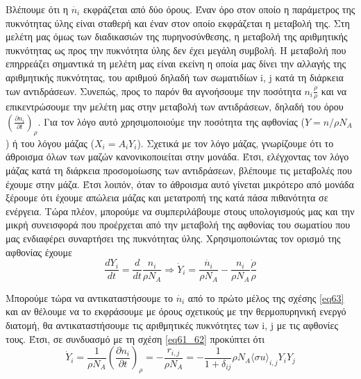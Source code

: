 Βλέπουμε ότι η $\dot{n_{i}}$ εκφράζεται από δύο όρους. Έναν όρο στον οποίο η παράμετρος της πυκνότητας ύλης είναι σταθερή και έναν στον οποίο εκφράζεται η μεταβολή της. Στη μελέτη μας όμως των διαδικασιών της πυρηνοσύνθεσης, η μεταβολή της αριθμητικής πυκνότητας ως προς την πυκνότητα ύλης δεν έχει μεγάλη συμβολή. Η μεταβολή που επηρρεάζει σημαντικά τη μελέτη μας είναι εκείνη η οποία μας δίνει την αλλαγής της αριθμητικής πυκνότητας, του αριθμού δηλαδή των σωματιδίων i, j κατά τη διάρκεια των αντιδράσεων. Συνεπώς, προς το παρόν θα αγνοήσουμε την ποσότητα $n_{i}\frac{\dot{\rho}}{\rho}$ και να επικεντρώσουμε την μελέτη μας στην μεταβολή των αντιδράσεων, δηλαδή του όρου $\left( \frac{\partial n_{i}}{\partial t} \right)_{\rho} $.
Για τον λόγο αυτό χρησιμοποιούμε την ποσότητα της αφθονίας ($Y=n/\rho N_{A}$) ή του λόγου μάζας ($X_{i}=A_{i}Y_{i}$). Σχετικά με τον λόγο μάζας, γνωρίζουμε ότι το άθροισμα όλων των μαζών κανονικοποιείται στην μονάδα. Έτσι, ελέγχοντας τον λόγο μάζας κατά τη διάρκεια προσομοίωσης των αντιδράσεων, βλέπουμε τις μεταβολές που έχουμε στην μάζα. Έτσι λοιπόν, όταν το άθροισμα  αυτό γίνεται μικρότερο από μονάδα ξέρουμε ότι έχουμε απώλεια μάζας και μετατροπή της κατά πάσα πιθανότητα σε ενέργεια.
Τώρα πλέον, μπορούμε να συμπεριλάβουμε στους υπολογισμούς μας και την μικρή συνεισφορά που προέρχεται από την μεταβολή της αφθονίας του σωματίου που μας ενδιαφέρει συναρτήσει της πυκνότητας ύλης. Χρησιμοποιώντας τον ορισμό της αφθονίας έχουμε
\begin{equation}
\label{eq64}
\dfrac{{dY}_{i}}{dt}=\frac{d }{dt} \frac{n_{i}}{\rho N_{A}}\Rightarrow \dot{Y}_{i}= \frac{\dot{n_{i}}}{\rho N_{A}}-\frac{n_{i}}{\rho N_{A}} \frac{\dot{\rho}}{\rho}
\end{equation}

Μπορούμε τώρα να αντικαταστήσουμε το $\dot{n_{i}}$ από το πρώτο μέλος της σχέσης \eqref{eq63} και αν θέλουμε να το εκφράσουμε με όρους σχετικούς με την θερμοπυρηνική ενεργό διατομή, θα αντικαταστήσουμε τις αριθμητικές πυκνότητες των i, j με τις αφθονίες τους. Έτσι, σε συνδυασμό με τη σχέση \eqref{eq61_62} προκύπτει ότι
\begin{equation}
\label{eq65}
\dot{Y}_{i}= \frac{1}{\rho N_{A}} \left( \frac{\partial n_{i}}{\partial t} \right)_{\rho} = - \frac{r_{i,j}}{\rho N_{A}}=-\frac{1}{1+ \delta_{ij}}\rho N_{A} \langle\sigma u \rangle _{i,j} Y_{i}Y_{j}
\end{equation}

